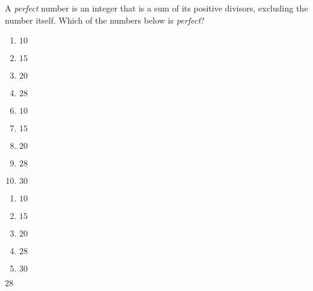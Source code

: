 

  A \textit{perfect} number is an integer that is a sum of its positive divisors, excluding the number itself.  Which of the numbers below is \textit{perfect}?


\ifsat
	\begin{enumerate}[label=\Alph*)]
		\item  $10$ 
		\item  $15$ 
		\item  $20$ 
		\item  $28$ %
	\end{enumerate}
\else
\fi

\ifacteven
	\begin{enumerate}[label=\textbf{\Alph*.},itemsep=\fill,align=left]
		\setcounter{enumii}{5}
		\item  $10$ 
		\item  $15$ 
		\item  $20$ 
		\addtocounter{enumii}{1}
		\item  $28$ %
		\item  $30$  
	\end{enumerate}
\else
\fi

\ifactodd
	\begin{enumerate}[label=\textbf{\Alph*.},itemsep=\fill,align=left]
		\item  $10$ 
		\item  $15$ 
		\item  $20$ 
		\item  $28$ %
		\item  $30$  
	\end{enumerate}
\else
\fi

\ifgridin
  $28$ %

\else
\fi

